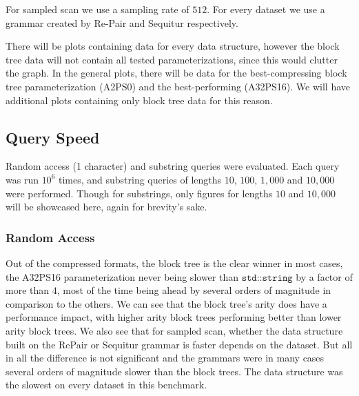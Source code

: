 \documentclass{scrartcl}
\begin{document}
For sampled scan we use a sampling rate of $512$.
For every dataset we use a grammar created by Re-Pair \cite{larsson_off-line_2000} and Sequitur \cite{nevill-manning_identifying_1997} respectively.

There will be plots containing data for every data structure, however the block tree data will not contain all tested parameterizations, since this would clutter the graph.
In the general plots, there will be data for the best-compressing block tree parameterization (A2PS0) and the best-performing (A32PS16).
We will have additional plots containing only block tree data for this reason.


\subsection{Query Speed}

Random access (1 character) and substring queries were evaluated.
Each query was run $10^6$ times, and substring queries of lengths $10$, $100$, $1,000$ and $10,000$ were performed.
Though for substrings, only figures for lengths $10$ and $10,000$ will be showcased here, again for brevity's sake.

\subsubsection{Random Access}

Out of the compressed formats, the block tree is the clear winner in most cases, the A32PS16 parameterization never being slower than $\texttt{std::string}$ by a factor of more than $4$,
most of the time being ahead by several orders of magnitude in comparison to the others.
We can see that the block tree's arity does have a performance impact, with higher arity block trees performing better than lower arity block trees.
We also see that for sampled scan, whether the data structure built on the RePair or Sequitur grammar is faster depends on the dataset.
But all in all the difference is not significant and the grammars were in many cases several orders of magnitude slower than the block trees.
The \lzend{} data structure was the slowest on every dataset in this benchmark.
\end{document}
